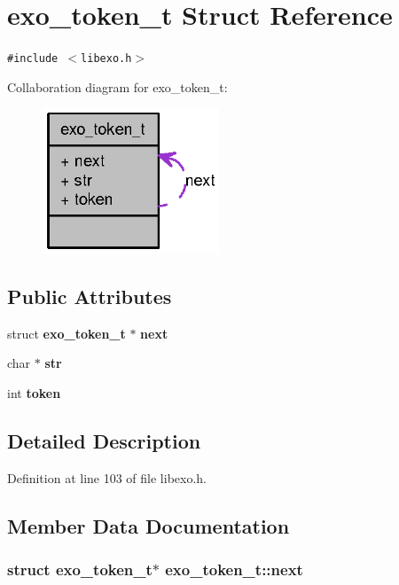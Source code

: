 \section{exo\_\-token\_\-t Struct Reference}
\label{structexo__token__t}
{\tt \#include $<$libexo.h$>$}

Collaboration diagram for exo\_\-token\_\-t:\nopagebreak
\begin{figure}[H]
\begin{center}
\leavevmode
\includegraphics[width=149pt]{structexo__token__t__coll__graph}
\end{center}
\end{figure}
\subsection*{Public Attributes}
\begin{CompactItemize}
\item 
struct {\bf exo\_\-token\_\-t} $\ast$ {\bf next}
\item 
char $\ast$ {\bf str}
\item 
int {\bf token}
\end{CompactItemize}


\subsection{Detailed Description}


Definition at line 103 of file libexo.h.

\subsection{Member Data Documentation}
\subsubsection[{next}]{\setlength{\rightskip}{0pt plus 5cm}struct {\bf exo\_\-token\_\-t}$\ast$ {\bf exo\_\-token\_\-t::next}\hspace{0.3cm}{\tt  [read]}}\label{structexo__token__t_89590586ca9a3e53117daa47f8270218}




